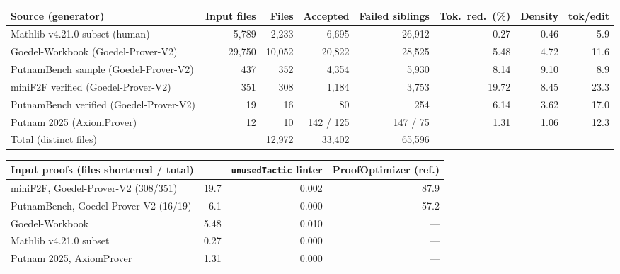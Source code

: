 \begin{tabular}{lrrrrrrr}
\toprule
Source (generator) & Input files & Files & Accepted & Failed siblings & Tok.\ red.\ (\%) & Density & tok/edit \\
\midrule
Mathlib v4.21.0 subset (human) & 5{,}789 & 2{,}233 & 6{,}695 & 26{,}912 & 0.27 & 0.46 & 5.9 \\
Goedel-Workbook (Goedel-Prover-V2) & 29{,}750 & 10{,}052 & 20{,}822 & 28{,}525 & 5.48 & 4.72 & 11.6 \\
PutnamBench sample (Goedel-Prover-V2) & 437 & 352 & 4{,}354 & 5{,}930 & 8.14 & 9.10 & 8.9 \\
miniF2F verified (Goedel-Prover-V2) & 351 & 308 & 1{,}184 & 3{,}753 & 19.72 & 8.45 & 23.3 \\
PutnamBench verified (Goedel-Prover-V2) & 19 & 16 & 80 & 254 & 6.14 & 3.62 & 17.0 \\
Putnam 2025 (AxiomProver) & 12 & 10 & 142 / 125 & 147 / 75 & 1.31 & 1.06 & 12.3 \\
\midrule
Total (distinct files) & & 12{,}972 & 33{,}402 & 65{,}596 & & & \\
\bottomrule
\end{tabular}

\begin{tabular}{lrrr}
\toprule
Input proofs (files shortened / total) & \LP{} & \texttt{unusedTactic} linter & ProofOptimizer (ref.) \\
\midrule
miniF2F, Goedel-Prover-V2 (308/351) & 19.7 & 0.002 & 87.9 \\
PutnamBench, Goedel-Prover-V2 (16/19) & 6.1 & 0.000 & 57.2 \\
Goedel-Workbook & 5.48 & 0.010 & --- \\
Mathlib v4.21.0 subset & 0.27 & 0.000 & --- \\
Putnam 2025, AxiomProver & 1.31 & 0.000 & --- \\
\bottomrule
\end{tabular}


